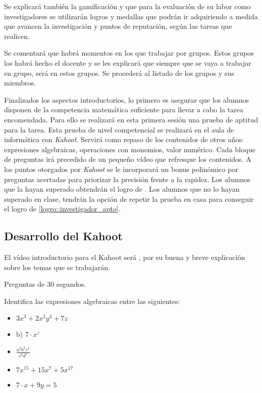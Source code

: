 Se explicará también la gamificación y que para la evaluación de su labor como investigadores se utilizarán logros y medallas que podrán ir adquiriendo a medida que avancen la investigación y puntos de reputación, según las tareas que realicen.

Se comentará que habrá momentos en los que trabajar por grupos.
%
Estos grupos los habrá hecho el docente  y se les explicará que siempre que se vaya a trabajar en grupo, será en estos grupos.
%
Se procederá al listado de los grupos y sus miembros.

Finalizados los aspectos introductorios, lo primero es asegurar que los alumnos disponen de la competencia matemática suficiente para llevar a cabo la tarea encomendada.
%
Para ello se realizará en esta primera sesión una prueba de aptitud para la tarea.
%
Esta prueba de nivel competencial se realizará en el aula de informática con \textit{Kahoot}.
%
Servirá como repaso de los contenidos de otros años: expresiones algebraicas, operaciones con monomios, valor numérico.
%
Cada bloque de preguntas irá precedido de un pequeño vídeo que refresque los contenidos.
%
A los puntos otorgados por \textit{Kahoot} se le incorporará un bonus polinómico por preguntas acertadas para priorizar la precisión frente a la rapidez.
%
Los alumnos que la hayan superado obtendrán el logro de .
%
Los alumnos que no lo hayan superado en clase, tendrán la opción de repetir la prueba en casa para conseguir el logro de \ref{logro::investigador_apto}.


\subsection{Desarrollo del Kahoot}

El vídeo introductorio para el Kahoot será \cite{VideoKahootSes1}, por su buena y breve explicación sobre los temas que se trabajarán.

\newbloq Preguntas de 30 segundos.

\newpreg Identifica las expresiones algebraicas entre las siguientes:

\begin{itemize}
\item {} $3x^3+2x^2y^3 + 7z$
\item b) $7·x^z$
\item {} $\frac{a^2b^3c^1}{c^6d^5}$
\item {} $7x^{15} + 15x^7 + 5x^{17}$
\item {} $7·x+9y = 5$
\end{itemize}


